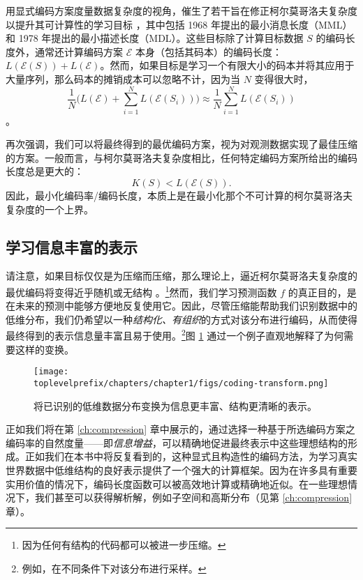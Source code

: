 \documentclass[../../book-main_zh.tex]{subfiles}
\begin{document}
\begin{remark}\label{rem:computable-complexity}
    {用显式编码方案度量数据复杂度的视角，催生了若干旨在修正柯尔莫哥洛夫复杂度以提升其可计算性的学习目标 \cite{WallaceC1999}，其中包括 1968 年提出的最小消息长度（MML）\cite{WallaceC1968} 和 1978 年提出的最小描述长度（MDL）\cite{Rissanen-1978,HansenM2001}。这些目标除了计算目标数据 $S$ 的编码长度外，通常还计算编码方案 $\mathcal{E}$ 本身（包括其码本）的编码长度：$L(\mathcal E(S)) + L(\mathcal E)$。然而，如果目标是学习一个有限大小的码本并将其应用于大量序列，那么码本的摊销成本可以忽略不计，因为当 $N$ 变得很大时，$$\frac{1}{N}\Big( L(\mathcal{E}) + \sum_{i=1}^N L(\mathcal{E}(S_i))\Big) \approx \frac{1}{N}\sum_{i=1}^N L(\mathcal{E}(S_i))$$。}
\end{remark}

再次强调，我们可以将最终得到的最优编码方案，视为对观测数据实现了最佳压缩的方案。一般而言，与柯尔莫哥洛夫复杂度相比，任何特定编码方案所给出的编码长度总是更大的：
\begin{equation}
    K(S) < L( \mathcal E(S)).
\end{equation} 
因此，最小化编码率/编码长度，本质上是在最小化那个不可计算的柯尔莫哥洛夫复杂度的一个上界。

\subsection{学习信息丰富的表示}

请注意，如果目标仅仅是为压缩而压缩，那么理论上，逼近柯尔莫哥洛夫复杂度的最优编码将变得近乎随机或无结构 \cite{Chaitin-1966}。\footnote{因为任何有结构的代码都可以被进一步压缩。}然而，我们学习预测函数 $f$ 的真正目的，是在未来的预测中能够方便地反复使用它。因此，尽管压缩能帮助我们识别数据中的低维分布，我们仍希望以一种{\em 结构化、有组织}的方式对该分布进行编码，从而使得最终得到的表示信息量丰富且易于使用。\footnote{例如，在不同条件下对该分布进行采样。}图 \ref{fig:expansion} 通过一个例子直观地解释了为何需要这样的变换。

\begin{figure}
    \centering
    \texttt{[image: \\toplevelprefix/chapters/chapter1/figs/coding-transform.png]}
    \caption{将已识别的低维数据分布变换为信息更丰富、结构更清晰的表示。}
    \label{fig:expansion}
\end{figure}
正如我们将在第 \ref{ch:compression} 章中展示的，通过选择一种基于所选编码方案之编码率的自然度量——即{\em 信息增益}，可以精确地促进最终表示中这些理想结构的形成。正如我们在本书中将反复看到的，这种显式且构造性的编码方法，为学习真实世界数据中低维结构的良好表示提供了一个强大的计算框架。因为在许多具有重要实用价值的情况下，编码长度函数可以被高效地计算或精确地近似。在一些理想情况下，我们甚至可以获得解析解，例如子空间和高斯分布（见第 \ref{ch:compression} 章）。
\end{document}
